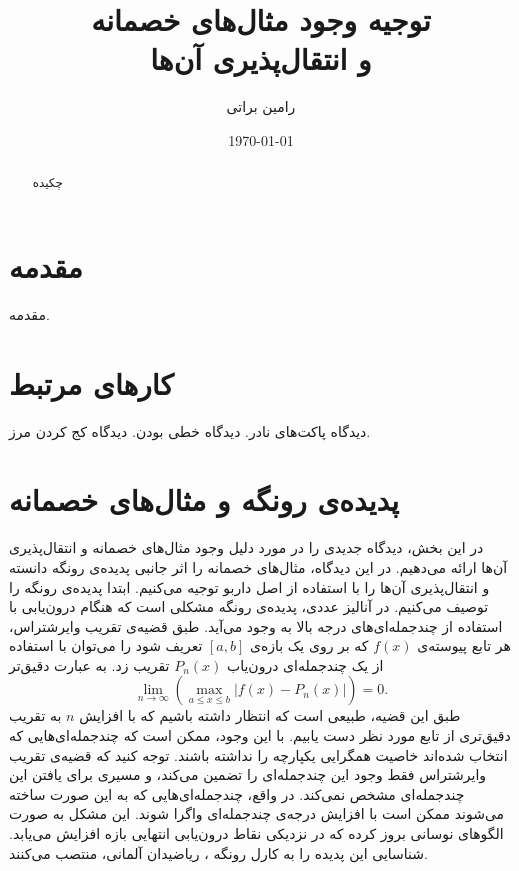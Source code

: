 \documentclass[12pt,onecolumn,a4paper]{article}
\begin{document}
\title{توجیه وجود مثال‌های خصمانه \\ و انتقال‌پذیری آن‌ها} 
\author{رامین براتی}
\date{\today}
\maketitle

\begin{abstract}
چکیده
\end{abstract}

\section{مقدمه} 
مقدمه.

\section{کارهای مرتبط}
دیدگاه پاکت‌های نادر.
دیدگاه خطی بودن.
دیدگاه کج کردن مرز.

\section{پدیده‌ی رونگه و مثال‌های خصمانه}
در این بخش، دیدگاه جدیدی را در مورد دلیل وجود مثال‌های خصمانه و انتقال‌پذیری آن‌ها ارائه می‌دهیم. در این دیدگاه، مثال‌های خصمانه را اثر جانبی پدیده‌ی رونگه دانسته و انتقال‌پذیری آن‌ها را با استفاده از اصل داربو توجیه می‌کنیم. ابتدا پدیده‌ی رونگه را توصیف می‌کنیم. در آنالیز عددی، پدیده‌ی رونگه مشکلی است که هنگام درون‌یابی با استفاده از چندجمله‌ای‌های درجه بالا به وجود می‌آید. طبق قضیه‌ی تقریب وایرشتراس،
هر تابع پیوسته‌ی 
$f(x)$
که بر روی یک بازه‌ی
$[a,b]$
تعریف شود را می‌توان با استفاده از یک چندجمله‌ای درون‌یاب
$P_n(x)$
تقریب زد. به عبارت دقیق‌تر
\begin{equation*}
    \lim_{n\rightarrow \infty}\left(\max _{{a\leq x\leq b}}\left|f(x)-P_{n}(x)\right|\right)=0.
\end{equation*}
طبق این قضیه، طبیعی است که انتظار داشته باشیم که با افزایش 
$n$
به تقریب دقیق‌تری از تابع مورد نظر دست یابیم. با این وجود، ممکن است که چندجمله‌ای‌هایی که انتخاب شده‌اند خاصیت همگرایی یکپارچه را نداشته باشند. توجه کنید که قضیه‌ی تقریب وایرشتراس فقط وجود این چندجمله‌ای را تضمین می‌کند، و مسیری برای یافتن این چندجمله‌ای مشخص نمی‌کند. در واقع، چندجمله‌ای‌هایی که به این صورت ساخته می‌شوند ممکن است با افزایش درجه‌ی چندجمله‌ای واگرا شوند. این مشکل به صورت الگوهای نوسانی بروز کرده که در نزدیکی نقاط درون‌یابی انتهایی بازه افزایش می‌یابد. شناسایی این پدیده را به  کارل رونگه
،
ریاضیدان آلمانی، منتصب می‌کنند.
\end{document}
